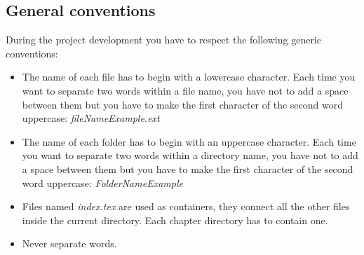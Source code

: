 \subsection{General conventions}
During the project development you have to respect the following generic conventions:
\begin{itemize}
  \item The name of each file has to begin with a lowercase character. Each time you want to separate two words within a file name, you have not to add a space between them but you have to make the first character of the second word uppercase: \textit{fileNameExample.ext}
  \item The name of each folder has to begin with an uppercase character. Each time you want to separate two words within a directory name, you have not to add a space between them but you have to make the first character of the second word uppercase: \textit{FolderNameExample}
  \item Files named \textit{index.tex} are used as containers, they connect all the other files inside the current directory. Each chapter directory has to contain one.
  \item Never separate words.
\end{itemize}
